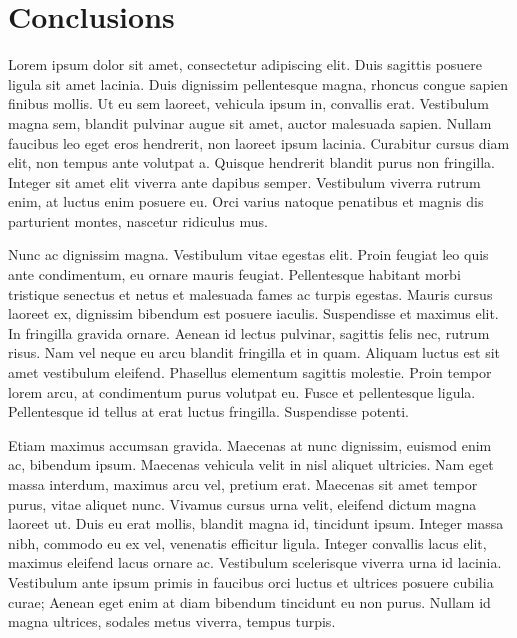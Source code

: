 \documentclass[
  letterpaper,
  DIV=11,
  numbers=noendperiod]{scrreprt}
\begin{document}

\chapter*{Conclusions}\label{conclusions}


Lorem ipsum dolor sit amet, consectetur adipiscing elit. Duis sagittis
posuere ligula sit amet lacinia. Duis dignissim pellentesque magna,
rhoncus congue sapien finibus mollis. Ut eu sem laoreet, vehicula ipsum
in, convallis erat. Vestibulum magna sem, blandit pulvinar augue sit
amet, auctor malesuada sapien. Nullam faucibus leo eget eros hendrerit,
non laoreet ipsum lacinia. Curabitur cursus diam elit, non tempus ante
volutpat a. Quisque hendrerit blandit purus non fringilla. Integer sit
amet elit viverra ante dapibus semper. Vestibulum viverra rutrum enim,
at luctus enim posuere eu. Orci varius natoque penatibus et magnis dis
parturient montes, nascetur ridiculus mus.

Nunc ac dignissim magna. Vestibulum vitae egestas elit. Proin feugiat
leo quis ante condimentum, eu ornare mauris feugiat. Pellentesque
habitant morbi tristique senectus et netus et malesuada fames ac turpis
egestas. Mauris cursus laoreet ex, dignissim bibendum est posuere
iaculis. Suspendisse et maximus elit. In fringilla gravida ornare.
Aenean id lectus pulvinar, sagittis felis nec, rutrum risus. Nam vel
neque eu arcu blandit fringilla et in quam. Aliquam luctus est sit amet
vestibulum eleifend. Phasellus elementum sagittis molestie. Proin tempor
lorem arcu, at condimentum purus volutpat eu. Fusce et pellentesque
ligula. Pellentesque id tellus at erat luctus fringilla. Suspendisse
potenti.

Etiam maximus accumsan gravida. Maecenas at nunc dignissim, euismod enim
ac, bibendum ipsum. Maecenas vehicula velit in nisl aliquet ultricies.
Nam eget massa interdum, maximus arcu vel, pretium erat. Maecenas sit
amet tempor purus, vitae aliquet nunc. Vivamus cursus urna velit,
eleifend dictum magna laoreet ut. Duis eu erat mollis, blandit magna id,
tincidunt ipsum. Integer massa nibh, commodo eu ex vel, venenatis
efficitur ligula. Integer convallis lacus elit, maximus eleifend lacus
ornare ac. Vestibulum scelerisque viverra urna id lacinia. Vestibulum
ante ipsum primis in faucibus orci luctus et ultrices posuere cubilia
curae; Aenean eget enim at diam bibendum tincidunt eu non purus. Nullam
id magna ultrices, sodales metus viverra, tempus turpis.
\end{document}

